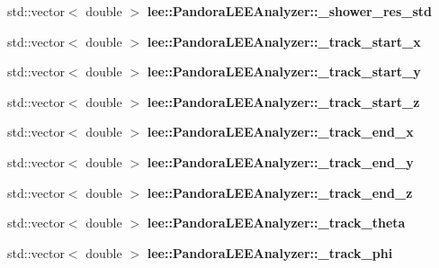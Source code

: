\begin{DoxyCompactItemize}
\item 
\hypertarget{group__lee_ga3a0c057fc83d09918ac2aa805d5bf3c7}{std\-::vector$<$ double $>$ {\bfseries lee\-::\-Pandora\-L\-E\-E\-Analyzer\-::\-\_\-shower\-\_\-res\-\_\-std}}\label{group__lee_ga3a0c057fc83d09918ac2aa805d5bf3c7}

\item 
\hypertarget{group__lee_ga1a0667bd934f598a41bb776e028270f4}{std\-::vector$<$ double $>$ {\bfseries lee\-::\-Pandora\-L\-E\-E\-Analyzer\-::\-\_\-track\-\_\-start\-\_\-x}}\label{group__lee_ga1a0667bd934f598a41bb776e028270f4}

\item 
\hypertarget{group__lee_ga55a26b4d446ea4597e44b2fc22de4cc6}{std\-::vector$<$ double $>$ {\bfseries lee\-::\-Pandora\-L\-E\-E\-Analyzer\-::\-\_\-track\-\_\-start\-\_\-y}}\label{group__lee_ga55a26b4d446ea4597e44b2fc22de4cc6}

\item 
\hypertarget{group__lee_ga71d7b5e5347441a36d0a33710d6c4483}{std\-::vector$<$ double $>$ {\bfseries lee\-::\-Pandora\-L\-E\-E\-Analyzer\-::\-\_\-track\-\_\-start\-\_\-z}}\label{group__lee_ga71d7b5e5347441a36d0a33710d6c4483}

\item 
\hypertarget{group__lee_ga78cb36dded5326c08cae77d5af6f3cd2}{std\-::vector$<$ double $>$ {\bfseries lee\-::\-Pandora\-L\-E\-E\-Analyzer\-::\-\_\-track\-\_\-end\-\_\-x}}\label{group__lee_ga78cb36dded5326c08cae77d5af6f3cd2}

\item 
\hypertarget{group__lee_ga55174718268fd53d080c224f60f96488}{std\-::vector$<$ double $>$ {\bfseries lee\-::\-Pandora\-L\-E\-E\-Analyzer\-::\-\_\-track\-\_\-end\-\_\-y}}\label{group__lee_ga55174718268fd53d080c224f60f96488}

\item 
\hypertarget{group__lee_ga147c8d113ee9fc316a7addd39e392d71}{std\-::vector$<$ double $>$ {\bfseries lee\-::\-Pandora\-L\-E\-E\-Analyzer\-::\-\_\-track\-\_\-end\-\_\-z}}\label{group__lee_ga147c8d113ee9fc316a7addd39e392d71}

\item 
\hypertarget{group__lee_ga320eaa4a60f4628c6320c5c721f2899c}{std\-::vector$<$ double $>$ {\bfseries lee\-::\-Pandora\-L\-E\-E\-Analyzer\-::\-\_\-track\-\_\-theta}}\label{group__lee_ga320eaa4a60f4628c6320c5c721f2899c}

\item 
\hypertarget{group__lee_gae045ae6a478b38e3d165ced855b610e4}{std\-::vector$<$ double $>$ {\bfseries lee\-::\-Pandora\-L\-E\-E\-Analyzer\-::\-\_\-track\-\_\-phi}}\label{group__lee_gae045ae6a478b38e3d165ced855b610e4}


\end{DoxyCompactItemize}
